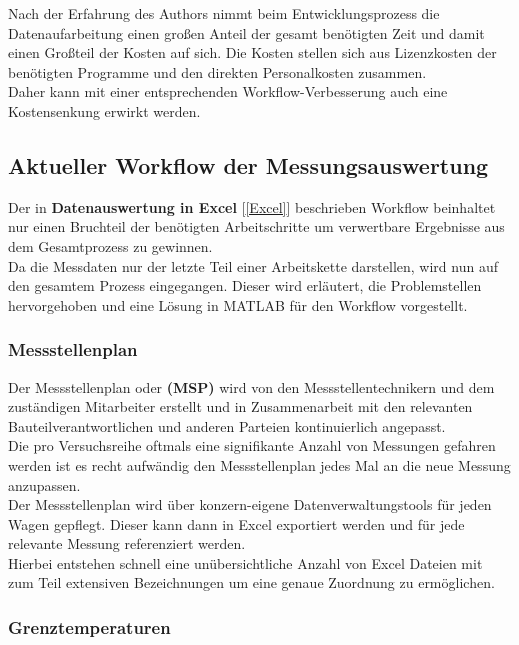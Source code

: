 Nach der Erfahrung des Authors nimmt beim Entwicklungsprozess die Datenaufarbeitung einen großen Anteil der gesamt benötigten Zeit und damit einen Großteil der Kosten auf sich. Die Kosten stellen sich aus Lizenzkosten der benötigten Programme und den direkten Personalkosten zusammen. \\
Daher kann mit einer entsprechenden Workflow-Verbesserung auch eine Kostensenkung erwirkt werden. \\

\newpage
\subsection{Aktueller Workflow der Messungsauswertung}

Der in \textbf{Datenauswertung in Excel} [\ref{Excel}] beschrieben Workflow beinhaltet nur einen Bruchteil der benötigten Arbeitschritte um verwertbare Ergebnisse aus dem Gesamtprozess zu gewinnen. \\

Da die Messdaten nur der letzte Teil einer Arbeitskette darstellen, wird nun auf den gesamtem Prozess eingegangen. Dieser wird erläutert, die Problemstellen hervorgehoben und eine Lösung in MATLAB für den Workflow vorgestellt. \\

\subsubsection{Messstellenplan}

Der Messstellenplan oder \textbf{(MSP)} wird von den Messstellentechnikern und dem zuständigen Mitarbeiter erstellt und in Zusammenarbeit mit den relevanten Bauteilverantwortlichen und anderen Parteien kontinuierlich angepasst.\\
Die pro Versuchsreihe oftmals eine signifikante Anzahl von Messungen gefahren werden ist es recht aufwändig den Messstellenplan jedes Mal an die neue Messung anzupassen. \\
Der Messstellenplan wird über konzern-eigene Datenverwaltungstools für jeden Wagen gepflegt. Dieser kann dann in Excel exportiert werden und für jede relevante Messung referenziert werden. \\
Hierbei entstehen schnell eine unübersichtliche Anzahl von Excel Dateien mit zum Teil extensiven Bezeichnungen um eine genaue Zuordnung zu ermöglichen. \\

\subsubsection{Grenztemperaturen}

